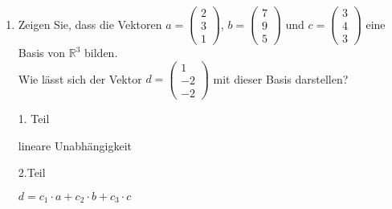 \documentclass[12pt,a4paper]{scrreprt}
\newcommand{\R}{\mathds{R}}
\begin{document}
\begin{enumerate}
	\begin{enumerate}
		\item genau eine Lösung,

		$a\neq -1$ \hspace{1em}($b$ egal)
		
		für $a=0, b=0$: $y=2, z=0, x=0$
		
		\item keine Lösung,
		
		sodass min. eine Zeile einen Wiederspruch ergibt
		$a=-1, b\neq 2$
		
		\item unendlich viele Lösungen ?
		
		sodass eine Zeile komplett Null ist: 
		$a=-1, b=2 $ soweit keine weiteren Gleichungen zum LGS zählen
		
		$\Rightarrow  y=t, z=2-t, x=-10+5t$ ergibt unendliche viele Lösungen für $t \in \R$
		
		z.B. $t=1 \Rightarrow x=-5, y=1, z=1$
	\end{enumerate}

Geben Sie die Lösungen in den Fällen a) und c) an.
%

	
	\item
Zeigen Sie, dass die Vektoren $a=\begin{pmatrix} 2 \\ 3 \\ 1 \end{pmatrix}$,  $b=\begin{pmatrix} 7 \\ 9 \\ 5 \end{pmatrix}$ und $c=\begin{pmatrix} 3 \\ 4 \\ 3 \end{pmatrix}$ eine Basis von $\R^3$ bilden. \\
 Wie lässt sich der Vektor $d=\begin{pmatrix} 1 \\ -2 \\ -2 \end{pmatrix}$ mit dieser Basis darstellen? 

1. Teil

lineare Unabhängigkeit

2.Teil

$
d= c_1\cdot a + c_2\cdot b + c_3\cdot c
$


\end{enumerate}
\end{document}
